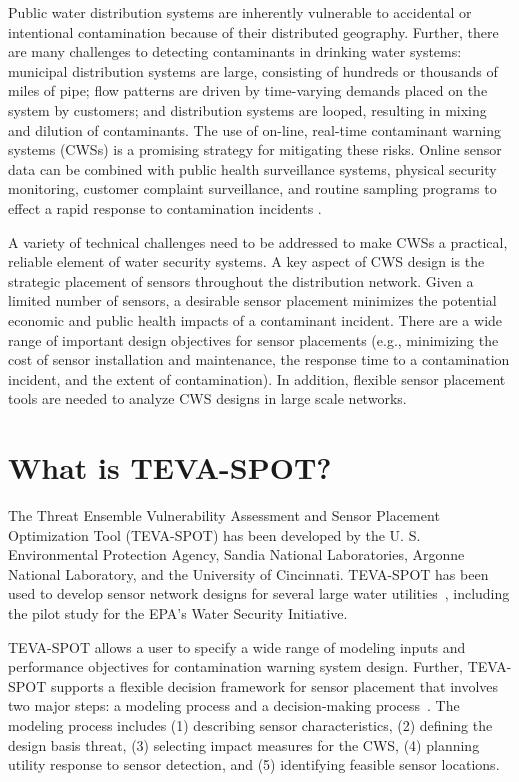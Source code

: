 Public water distribution systems are inherently vulnerable to accidental or intentional contamination because of their distributed geography. Further, there are many challenges to detecting contaminants in drinking water systems: municipal distribution systems are large, consisting of hundreds or thousands of miles of pipe; flow patterns are driven by time-\/varying demands placed on the system by customers; and distribution systems are looped, resulting in mixing and dilution of contaminants. The use of on-\/line, real-\/time contaminant warning systems (CWSs) is a promising strategy for mitigating these risks. Online sensor data can be combined with public health surveillance systems, physical security monitoring, customer complaint surveillance, and routine sampling programs to effect a rapid response to contamination incidents \citep{EPA}.

A variety of technical challenges need to be addressed to make CWSs a practical, reliable element of water security systems. A key aspect of CWS design is the strategic placement of sensors throughout the distribution network. Given a limited number of sensors, a desirable sensor placement minimizes the potential economic and public health impacts of a contaminant incident. There are a wide range of important design objectives for sensor placements (e.g., minimizing the cost of sensor installation and maintenance, the response time to a contamination incident, and the extent of contamination). In addition, flexible sensor placement tools are needed to analyze CWS designs in large scale networks.

\section{What is TEVA-\/SPOT?}\label{intro_introTEVASPOT}
The Threat Ensemble Vulnerability Assessment and Sensor Placement Optimization Tool (TEVA-\/SPOT) has been developed by the U. S. Environmental Protection Agency, Sandia National Laboratories, Argonne National Laboratory, and the University of Cincinnati. TEVA-\/SPOT has been used to develop sensor network designs for several large water   utilities~\cite{MorJanMurFox07},  including the pilot study for the EPA's Water Security Initiative.

TEVA-\/SPOT allows a user to specify a wide range of modeling inputs and performance objectives for contamination warning system design. Further, TEVA-\/SPOT supports a flexible decision framework for sensor placement that involves two major steps: a modeling process and a decision-\/making   process~\cite{MurBerHar06}.  The modeling process includes (1) describing sensor characteristics, (2) defining the design basis threat, (3) selecting impact measures for the CWS, (4) planning utility response to sensor detection, and (5) identifying feasible sensor locations.

